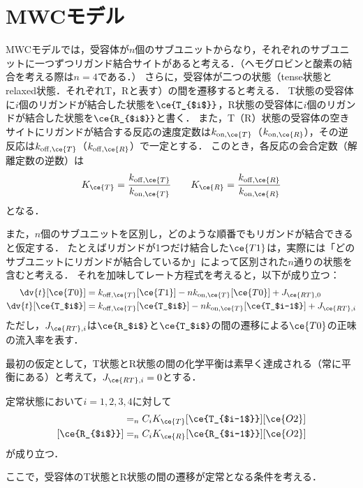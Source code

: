 \section{MWCモデル}

MWCモデルでは，受容体が$n$個のサブユニットからなり，それぞれのサブユニットに一つずつリガンド結合サイトがあると考える．（ヘモグロビンと酸素の結合を考える際は$n=4$である．）
さらに，受容体が二つの状態（tense状態とrelaxed状態．それぞれT，Rと表す）の間を遷移すると考える．
T状態の受容体に$i$個のリガンドが結合した状態を$\ce{T_{$i$}}$，R状態の受容体に$i$個のリガンドが結合した状態を$\ce{R_{$i$}}$と書く．
また，T（R）状態の受容体の空きサイトにリガンドが結合する反応の速度定数は$k_{\mathrm{on},\ce{T}}$（$k_{\mathrm{on},\ce{R}}$），その逆反応は$k_{\mathrm{off},\ce{T}}$（$k_{\mathrm{off},\ce{R}}$）で一定とする．
このとき，各反応の会合定数（解離定数の逆数）は
\begin{equation}
  K_{\ce{T}} = \frac{k_{\mathrm{off},\ce{T}}}{k_{\mathrm{on},\ce{T}}} \qquad K_{\ce{R}} = \frac{k_{\mathrm{off},\ce{R}}}{k_{\mathrm{on},\ce{R}}}
\end{equation}
となる．

また，$n$個のサブユニットを区別し，どのような順番でもリガンドが結合できると仮定する．
たとえばリガンドが1つだけ結合した$\ce{T1}$は，実際には「どのサブユニットにリガンドが結合しているか」によって区別された$n$通りの状態を含むと考える．
それを加味してレート方程式を考えると，以下が成り立つ：
\begin{align}
  \dv{t}[\ce{T0}] &= k_{\mathrm{off}, \ce{T}}[\ce{T1}] - n k_{\mathrm{on}, \ce{T}}[\ce{T0}] + J_{\ce{RT},0} \\
  \dv{t}[\ce{T_$i$}] &= k_{\mathrm{off}, \ce{T}}[\ce{T_$i$}] - n k_{\mathrm{on}, \ce{T}}[\ce{T_$i-1$}] + J_{\ce{RT},i} 
\end{align}
ただし，$J_{\ce{RT},i}$は$\ce{R_$i$}$と$\ce{T_$i$}$の間の遷移による$\ce{T0}$の正味の流入率を表す．

最初の仮定として，T状態とR状態の間の化学平衡は素早く達成される（常に平衡にある）と考えて，$J_{\ce{RT},i}=0$とする．



定常状態において$i=1,2,3,4$に対して
\begin{align}
  [\ce{T_{$i$}}] &= _n C _i K_{\ce{T}} [\ce{T_{$i-1$}}] [\ce{O2}] \\
  [\ce{R_{$i$}}] &= _n C _i K_{\ce{R}} [\ce{R_{$i-1$}}] [\ce{O2}] 
\end{align}
が成り立つ．

ここで，受容体のT状態とR状態の間の遷移が定常となる条件を考える．



